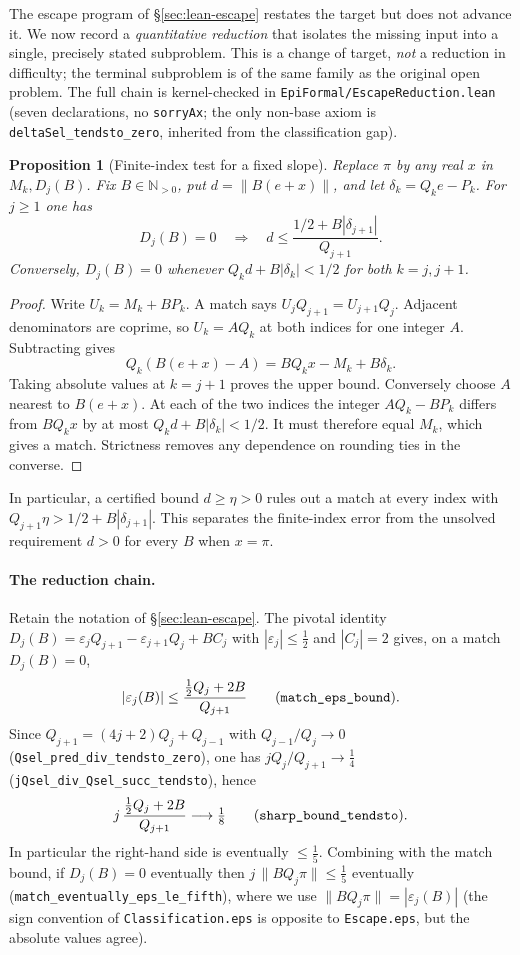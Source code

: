 \documentclass[11pt]{amsart}
\newtheorem{proposition}[theorem]{Proposition}
\theoremstyle{definition}
\theoremstyle{remark}
\numberwithin{equation}{section}
\newcommand{\N}{\mathbb{N}}
\begin{document}
The escape program of \S\ref{sec:lean-escape} restates the target but does not advance it. We now record a \emph{quantitative reduction} that isolates the missing input into a single, precisely stated subproblem. This is a change of target, \emph{not} a reduction in difficulty; the terminal subproblem is of the same family as the original open problem. The full chain is kernel-checked in \texttt{EpiFormal/EscapeReduction.lean} (seven declarations, no \texttt{sorryAx}; the only non-base axiom is \texttt{deltaSel\_tendsto\_zero}, inherited from the classification gap).

\begin{proposition}[Finite-index test for a fixed slope]
\label{prop:finite-match}
Replace $\pi$ by any real $x$ in $M_k,D_j(B)$. Fix $B\in\N_{>0}$,
put $d=\|B(e+x)\|$, and let $\delta_k=Q_ke-P_k$. For $j\ge1$ one has
\[
 D_j(B)=0\quad\Longrightarrow\quad
 d\le \frac{1/2+B|\delta_{j+1}|}{Q_{j+1}}.
\]
Conversely, $D_j(B)=0$ whenever
$Q_k d+B|\delta_k|<1/2$ for both $k=j,j+1$.
\end{proposition}
\begin{proof}
Write $U_k=M_k+BP_k$. A match says
$U_jQ_{j+1}=U_{j+1}Q_j$. Adjacent denominators are coprime, so
$U_k=AQ_k$ at both indices for one integer $A$. Subtracting gives
\[
 Q_k(B(e+x)-A)=BQ_kx-M_k+B\delta_k .
\]
Taking absolute values at $k=j+1$ proves the upper bound.
Conversely choose $A$ nearest to $B(e+x)$. At each of the two
indices the integer $AQ_k-BP_k$ differs from $BQ_kx$ by at most
$Q_kd+B|\delta_k|<1/2$. It must therefore equal $M_k$,
which gives a match. Strictness removes any dependence on rounding
ties in the converse.
\end{proof}
In particular, a certified bound $d\ge\eta>0$ rules out a match
at every index with $Q_{j+1}\eta>1/2+B|\delta_{j+1}|$.
This separates the finite-index error from the unsolved requirement
$d>0$ for every $B$ when $x=\pi$.

\paragraph{The reduction chain.} Retain the notation of \S\ref{sec:lean-escape}. The pivotal identity $D_j(B)=\varepsilon_jQ_{j+1}-\varepsilon_{j+1}Q_j+BC_j$ with $|\varepsilon_j|\le\tfrac12$ and $|C_j|=2$ gives, on a match $D_j(B)=0$,
\[
|\varepsilon_j(B)|\le\frac{\tfrac12Q_j+2B}{Q_{j+1}}
\qquad\text{(\texttt{match\_eps\_bound}).}
\]
Since $Q_{j+1}=(4j+2)Q_j+Q_{j-1}$ with $Q_{j-1}/Q_j\to0$ (\texttt{Qsel\_pred\_div\_tendsto\_zero}), one has $jQ_j/Q_{j+1}\to\tfrac14$ (\texttt{jQsel\_div\_Qsel\_succ\_tendsto}), hence
\[
j\,\frac{\tfrac12Q_j+2B}{Q_{j+1}}\longrightarrow\tfrac18
\qquad\text{(\texttt{sharp\_bound\_tendsto}).}
\]
In particular the right-hand side is eventually $\le\tfrac15$. Combining with the match bound, if $D_j(B)=0$ eventually then $j\,\|BQ_j\pi\|\le\tfrac15$ eventually (\texttt{match\_eventually\_eps\_le\_fifth}), where we use $\|BQ_j\pi\|=|\varepsilon_j(B)|$ (the sign convention of \texttt{Classification.eps} is opposite to \texttt{Escape.eps}, but the absolute values agree).
\end{document}
